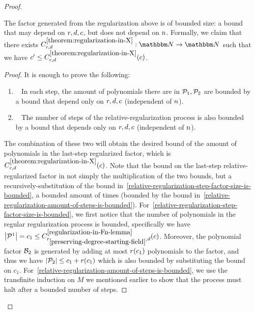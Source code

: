 \begin{proof}
\begin{claim}
        The factor generated from the regularization above is of bounded size: a bound that may depend on ${{{r}}}, d, c$, but does not depend on $n$.
        Formally, we claim that there exists $\funcdef{C^{\ref{theorem:regularization-in-X}}_{\rankfunc, \degree}}{\naturalnumbersset}{\naturalnumbersset}$
        such that we have $c^{\prime} \leq C^{\ref{theorem:regularization-in-X}}_{{{{r}}}, d}(c)$.
    \end{claim}
    \begin{proof}
        It is enough to prove the following:
        \begin{enumerate}
            \item~\label{relative-regularization-step-factor-size-is-bounded}
            In each step, the amount of polynomials there are in $\genpolyset_1, \genpolyset_2$ are bounded by a bound that depend only on ${{{r}}}, d, c$ (independent of $n$).
            \item~\label{relative-regularization-amount-of-steps-is-bounded}
            The number of steps of the relative-regularization process is also bounded by a bound that depends only on ${{{r}}}, d, c$ (independent of $n$).
        \end{enumerate}
        The combination of these two will obtain the desired bound of the amount of polynomials in the last-step regularized factor, which is $C^{\ref{theorem:regularization-in-X}}_{{{{r}}}, d}(c)$.
        Note that the bound on the last-step relative-regularized factor in not simply the multiplication of the two bounds,
        but a recursively-substitution of the bound in~\ref{relative-regularization-step-factor-size-is-bounded},
        a bounded amount of times (bounded by the bound in~\ref{relative-regularization-amount-of-steps-is-bounded}).
        \newline
        For~\ref{relative-regularization-step-factor-size-is-bounded}, we first notice that the number of polynomials in the regular regularization process is bounded,
        specifically we have $\abs{\genpolyset^1} = c_{1} \leq C^{\ref{regularization-in-Fn-lemma}}_{\rankfunc_{\ref{preserving-degree-starting-field}}, \degree}(c)$.
        Moreover, the polynomial factor $\mathcal{B}_2$ is generated by adding at most ${{{r}}}(c_1)$ polynomials to the factor, and thus we have $\abs{\genpolyset_2} \leq c_1 + \rankfunc(c_1)$ which is also bounded by substituting the bound on $c_1$.
        \newline
        For~\ref{relative-regularization-amount-of-steps-is-bounded}, we use the transfinite induction on $M$ we mentioned earlier to show that the process must halt after a bounded number of steps.

\end{proof}
\end{proof}
